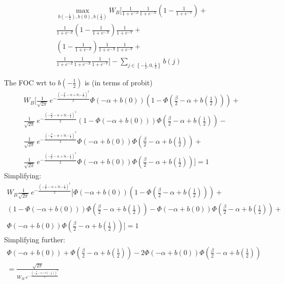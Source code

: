 \documentclass[12pt]{article}
\begin{document}
\begin{itemize}
\begin{itemize}
			  \begin{multline}
			    \max_{b\left(-\frac{1}{2}\right), b\left(0\right), b\left(\frac{1}{2}\right)} 
					W_B \biggl[ \frac{1}{1+e^{-Z}} \frac{1}{1+e^{-X}} \left(1-\frac{1}{1+e^{-Y}}\right)  + \\
					\frac{1}{1+e^{-Z}} \left(1-\frac{1}{1+e^{-X}}\right) \frac{1}{1+e^{-Y}} + \\
					\left(1-\frac{1}{1+e^{-Z}} \right) \frac{1}{1+e^{-X}} \frac{1}{1+e^{-Y}} + \\
					\frac{1}{1+e^{-Z}} \frac{1}{1+e^{-X}} \frac{1}{1+e^{-Y}} \biggr] - \sum_{j\in \left\{-\frac{1}{2}, 0,\frac{1}{2}\right\}} b(j)
					\label{eq:obj}
				\end{multline}
				
			The FOC wrt to $b\left(-\frac{1}{2}\right)$ is (in terms of probit)
				\begin{multline}
					W_B \biggl[ \frac{1}{\sqrt{2\pi}} \: e^{- \frac{\left(-\frac{\beta}{2} - \alpha + b(-\frac{1}{2}\right)^2}{2}} \Phi\left(- \alpha + b(0) \right)\left(1-\Phi\left(\frac{\beta}{2} - \alpha + b(\frac{1}{2}) \right)\right)  + \\
					\frac{1}{\sqrt{2\pi}} \: e^{- \frac{\left(-\frac{\beta}{2} - \alpha + b(-\frac{1}{2}\right)^2}{2}} \left(1-\Phi\left(- \alpha + b(0) \right)\right)\Phi\left(\frac{\beta}{2} - \alpha + b(\frac{1}{2}) \right) - \\
					\frac{1}{\sqrt{2\pi}} \: e^{- \frac{\left(-\frac{\beta}{2} - \alpha + b(-\frac{1}{2}\right)^2}{2}} \Phi\left(- \alpha + b(0) \right)\Phi\left(\frac{\beta}{2} - \alpha + b(\frac{1}{2}) \right) + \\
					\frac{1}{\sqrt{2\pi}} \: e^{- \frac{\left(-\frac{\beta}{2} - \alpha + b(-\frac{1}{2}\right)^2}{2}} \Phi\left(- \alpha + b(0) \right)\Phi\left(\frac{\beta}{2} - \alpha + b(\frac{1}{2}) \right) \biggr]  = 1
				\end{multline}
			Simplifying:
			\begin{multline}
					W_B \frac{1}{\sqrt{2\pi}} \: e^{- \frac{\left(-\frac{\beta}{2} - \alpha + b(-\frac{1}{2}\right)^2}{2}} \biggl[ \Phi\left(- \alpha + b(0) \right)\left(1-\Phi\left(\frac{\beta}{2} - \alpha + b(\frac{1}{2}) \right)\right)  + \\
					\left(1-\Phi\left(- \alpha + b(0) \right)\right)\Phi\left(\frac{\beta}{2} - \alpha + b(\frac{1}{2}) \right) - 
					\Phi\left(- \alpha + b(0) \right)\Phi\left(\frac{\beta}{2} - \alpha + b(\frac{1}{2}) \right) + \\
					\Phi\left(- \alpha + b(0) \right)\Phi\left(\frac{\beta}{2} - \alpha + b(\frac{1}{2}) \right) \biggr]  = 1
				\end{multline}
			Simplifying further:
			  \begin{multline}
					\Phi\left(- \alpha + b(0) \right)+ \Phi\left(\frac{\beta}{2} - \alpha + b(\frac{1}{2}) \right) 
					- 2\Phi\left(- \alpha + b(0) \right)\Phi\left(\frac{\beta}{2} - \alpha + b(\frac{1}{2}) \right) \\ = \frac{\sqrt{2\pi}}{W_B \: e^{- \frac{\left(-\frac{\beta}{2} - \alpha + b\left(-\frac{1}{2}\right)\right)^2}{2}} }
					\label{eq:firstfoc}
				\end{multline}
			

\end{itemize}
\end{itemize}
\end{document}
